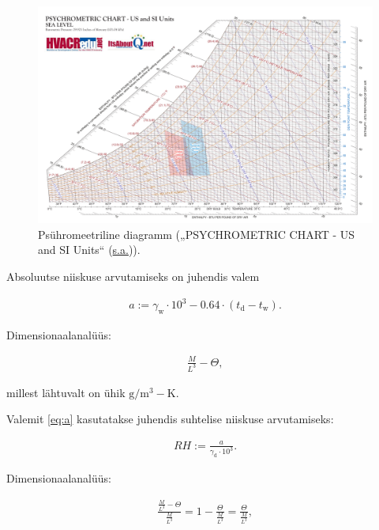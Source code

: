 \documentclass[
  12pt,
  a4paper,
  onecolumn, twoside]{article}
\begin{document}
\begin{figure}
\includegraphics[width=.96\textheight,height=\textheight,angle=270]{0000Psych11x17US_SI_logos} \caption{Psühromeetriline diagramm ({„PSYCHROMETRIC CHART - US and SI Units``} (\protect\hyperlink{ref-psychrometric-chart}{s.a.})).}\label{fig:psychrometric-diagram}
\end{figure}

Absoluutse niiskuse arvutamiseks on juhendis valem

\begin{align}
a := \gamma_\text{w} \cdot 10^3 - 0.64 \cdot (t_\text{d} - t_\text{w}).
\label{eq:a}
\end{align}

Dimensionaalanalüüs:

\begin{align}
\frac{M}{L^3} - \Theta,
\label{eq:dimensional-analysis-for-a}
\end{align}

millest lähtuvalt on ühik \(\unit{\gram\per\cubic\meter} - \unit{\kelvin}\).

Valemit \eqref{eq:a} kasutatakse juhendis suhtelise niiskuse arvutamiseks:

\begin{align}
RH := \frac{a}{\gamma_\text{d} \cdot 10^3}.
\label{eq:rh-in-instructions}
\end{align}

Dimensionaalanalüüs:

\begin{align}
\frac{\frac{M}{L^3} - \Theta}{\frac{M}{L^3}} = 1 - \frac{\Theta}{\frac{M}{L^3}} = \frac{\Theta}{\frac{M}{L^3}},
\label{eq:dimensional-analysis-for-rh-in-instructions}
\end{align}
\end{document}
